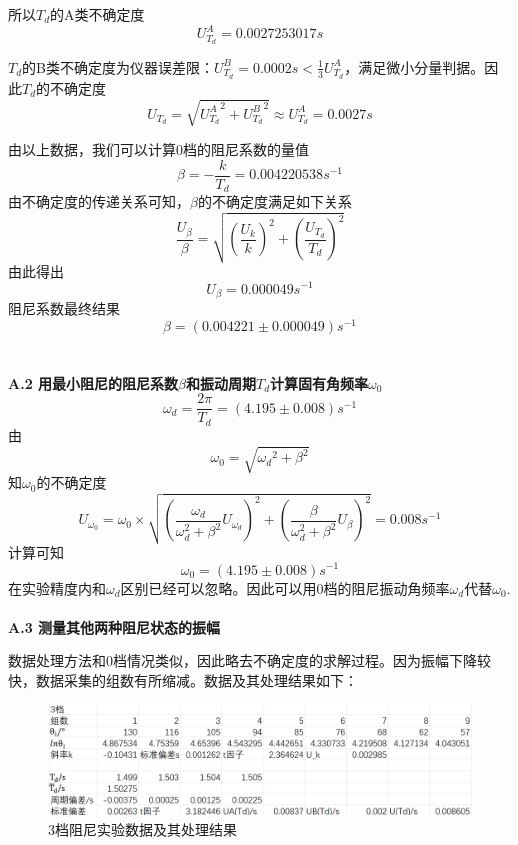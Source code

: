 \documentclass[a4paper,11pt]{article}
\begin{document}
        所以$T_d$的A类不确定度$$U^A_{T_d} = 0.0027253017s$$

        $T_d$的B类不确定度为仪器误差限：$U^B_{T_d} = 0.0002s < \frac{1}{3} U^A_{T_d}$，满足微小分量判据。因此$T_d$的不确定度
        $$
            U_{T_d} = \sqrt{{U^A_{T_d}}^2 + {U^B_{T_d}}^2} \approx  U^A_{T_d} = 0.0027s
        $$

        由以上数据，我们可以计算0档的阻尼系数的量值
        $$
            \beta = -\frac{k}{T_d} = 0.004220538s^{-1}
        $$
        由不确定度的传递关系可知，$\beta$的不确定度满足如下关系
        $$
            \frac{U_\beta}\beta = \sqrt{(\frac{U_k}k)^2 + (\frac{U_{T_d}}{T_d})^2}
        $$
        由此得出
        $$
            U_\beta = 0.000049s^{-1}
        $$
        阻尼系数最终结果
        $$
            \beta = (0.004221 \pm 0.000049)s^{-1}
        $$
        \\ \\
        \textbf{A.2 用最小阻尼的阻尼系数$\beta$和振动周期$T_d$计算固有角频率$\omega_0$}
        $$
            \omega_d = \frac{2\pi}{T_d} = (4.195 \pm 0.008)s^{-1}
        $$
        由
        $$
            \omega_0 = \sqrt{{\omega_d}^2 + \beta^2}
        $$
        知$\omega_0$的不确定度
        $$
            U_{\omega_0} = \omega_0 \times \sqrt{(\frac{\omega_d}{\omega_d^2+\beta^2}U_{\omega_d})^2 + (\frac\beta{\omega_d^2+\beta^2}U_\beta)^2} = 0.008s^{-1}
        $$
        计算可知
        $$
            \omega_0 = (4.195 \pm 0.008)s^{-1}
        $$
        在实验精度内和$\omega_d$区别已经可以忽略。因此可以用0档的阻尼振动角频率$\omega_d$代替$\omega_0$.
        \\ \\
        \textbf{A.3 测量其他两种阻尼状态的振幅}

        数据处理方法和0档情况类似，因此略去不确定度的求解过程。因为振幅下降较快，数据采集的组数有所缩减。数据及其处理结果如下：

        \begin{figure}[ht]
            \centering
            \includegraphics[scale=0.5]{3档阻尼 数据.png}
            \caption{3档阻尼实验数据及其处理结果}
        \end{figure}
\end{document}
